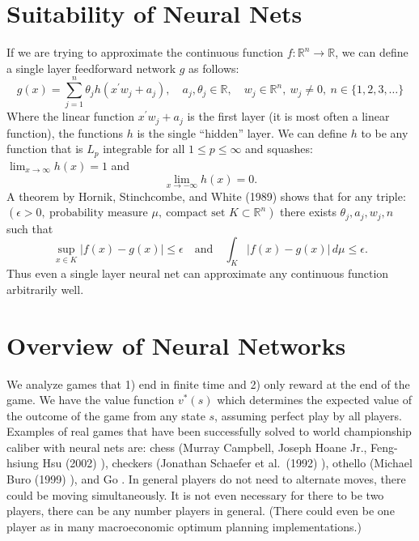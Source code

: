 \documentclass[11pt]{article}
\begin{document}
\section{Suitability of Neural Nets}
If we are trying to approximate the continuous function $f:\mathbb{R}^n\to\mathbb{R}$, we can define a single layer
feedforward network $g$ as follows:
\[
g(x)=\sum_{j=1}^n \theta_j h(x^\prime w_j + a_j),\quad a_j,\theta_j\in\mathbb{R},\quad w_j\in\mathbb{R}^n,\ w_j\neq 0,\ n\in\{1,2,3,\dots\}
\]
Where the linear function $x^\prime w_j + a_j$ is the first layer (it is most often a linear function), the
functions $h$ is the single ``hidden'' layer. We can define $h$ to be any function that is $L_p$ integrable
for all $1\leq p\leq\infty$ and squashes: $\lim_{x\to\infty}h(x)=1$ and
\[
\lim_{x\to-\infty}h(x)=0.
\]
A theorem by Hornik, Stinchcombe, and White (1989) \cite{hornik1989} shows that for any triple:
$(\epsilon>0,\ \text{probability measure }\mu,\ \text{compact set }K\subset\mathbb{R}^n)$ there exists $\theta_j,a_j,w_j,n$ such that
\[
\sup_{x\in K}\left|f(x)-g(x)\right|\le \epsilon
\quad\text{and}\quad
\int_K |f(x)-g(x)|\,d\mu\le \epsilon.
\]
Thus even a single layer neural net can approximate any continuous function arbitrarily well.

\section{Overview of Neural Networks}
We analyze games that 1) end in finite time and 2) only reward at the end of the game. We
have the value function $v^*(s)$ which determines the expected value of the outcome of the game
from any state $s$, assuming perfect play by all players.
Examples of real games that have been successfully solved to world championship caliber
with neural nets are: chess (Murray Campbell, Joseph Hoane Jr., Feng-hsiung Hsu (2002) \cite{campbell2002}), checkers
(Jonathan Schaefer et al.\ (1992) \cite{schaeffer1992}), othello (Michael Buro (1999) \cite{buro1999}), and
Go \cite{silver2016}.
In general players do not need to alternate moves, there could be moving simultaneously.
It is not even necessary for there to be two players, there can be any number players in general.
(There could even be one player as in many macroeconomic optimum planning implementations.)
\end{document}
